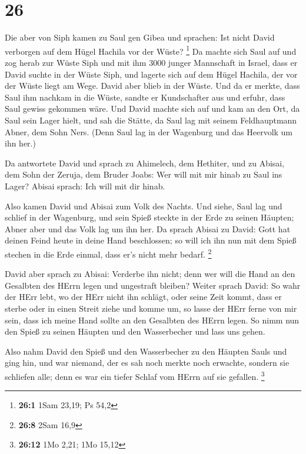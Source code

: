 \hypertarget{section-25}{%
\section{26}\label{section-25}}

 Die aber von Siph kamen zu Saul gen Gibea und sprachen:
Ist nicht David verborgen auf dem Hügel Hachila vor der Wüste?
\footnote{\textbf{26:1} 1Sam 23,19; Ps 54,2}  Da machte
sich Saul auf und zog herab zur Wüste Siph und mit ihm 3000 junger
Mannschaft in Israel, dass er David suchte in der Wüste Siph,
 und lagerte sich auf dem Hügel Hachila, der vor der Wüste
liegt am Wege. David aber blieb in der Wüste. Und da er merkte, dass
Saul ihm nachkam in die Wüste,  sandte er Kundschafter aus
und erfuhr, dass Saul gewiss gekommen wäre.  Und David
machte sich auf und kam an den Ort, da Saul sein Lager hielt, und sah
die Stätte, da Saul lag mit seinem Feldhauptmann Abner, dem Sohn Ners.
(Denn Saul lag in der Wagenburg und das Heervolk um ihn her.)

 Da antwortete David und sprach zu Ahimelech, dem
Hethiter, und zu Abisai, dem Sohn der Zeruja, dem Bruder Joabs: Wer will
mit mir hinab zu Saul ins Lager? Abisai sprach: Ich will mit dir hinab.

 Also kamen David und Abisai zum Volk des Nachts. Und
siehe, Saul lag und schlief in der Wagenburg, und sein Spieß steckte in
der Erde zu seinen Häupten; Abner aber und das Volk lag um ihn her.
 Da sprach Abisai zu David: Gott hat deinen Feind heute in
deine Hand beschlossen; so will ich ihn nun mit dem Spieß stechen in die
Erde einmal, dass er's nicht mehr bedarf. \footnote{\textbf{26:8} 2Sam
  16,9}

 David aber sprach zu Abisai: Verderbe ihn nicht; denn wer
will die Hand an den Gesalbten des HErrn legen und ungestraft bleiben?
 Weiter sprach David: So wahr der HErr lebt, wo der HErr
nicht ihn schlägt, oder seine Zeit kommt, dass er sterbe oder in einen
Streit ziehe und komme um,  so lasse der HErr ferne von
mir sein, dass ich meine Hand sollte an den Gesalbten des HErrn legen.
So nimm nun den Spieß zu seinen Häupten und den Wasserbecher und lass
uns gehen.

 Also nahm David den Spieß und den Wasserbecher zu den
Häupten Sauls und ging hin, und war niemand, der es sah noch merkte noch
erwachte, sondern sie schliefen alle; denn es war ein tiefer Schlaf vom
HErrn auf sie gefallen. \footnote{\textbf{26:12} 1Mo 2,21; 1Mo 15,12}

